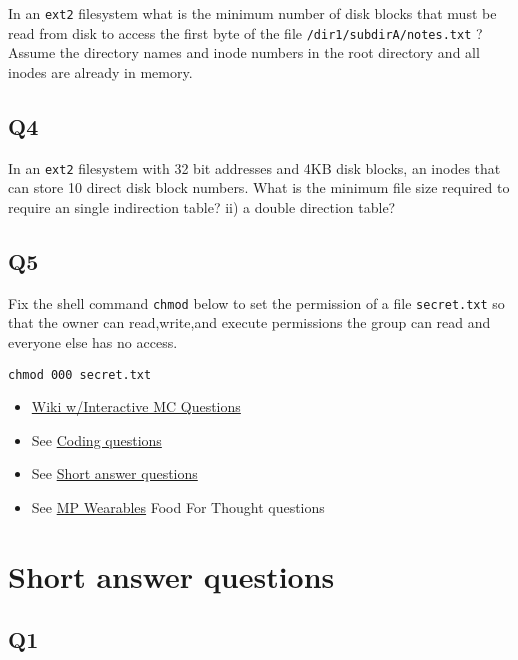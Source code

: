 In an \texttt{ext2} filesystem what is the minimum number of disk blocks
that must be read from disk to access the first byte of the file
\texttt{/dir1/subdirA/notes.txt} ? Assume the directory names and inode
numbers in the root directory and all inodes are already in memory.

\subsection{Q4}\label{q4-3}

In an \texttt{ext2} filesystem with 32 bit addresses and 4KB disk
blocks, an inodes that can store 10 direct disk block numbers. What is
the minimum file size required to require an single indirection table?
ii) a double direction table?

\subsection{Q5}\label{q5-2}

Fix the shell command \texttt{chmod} below to set the permission of a
file \texttt{secret.txt} so that the owner can read,write,and execute
permissions the group can read and everyone else has no access.

\begin{verbatim}
chmod 000 secret.txt
\end{verbatim}

\begin{itemize}
\tightlist
\item
  \href{http://angrave.github.io/SystemProgramming/networkingreviewquestions.html}{Wiki
  w/Interactive MC Questions}
\item
  See \protect\hyperlink{coding-questions}{Coding questions}
\item
  See \protect\hyperlink{short-answer-questions}{Short answer questions}
\item
  See \href{https://courses.engr.illinois.edu/cs241/mps/mp7/}{MP
  Wearables} Food For Thought questions
\end{itemize}

\hypertarget{short-answer-questions}{\section{Short answer
questions}\label{short-answer-questions}}

\subsection{Q1}\label{q1-5}

